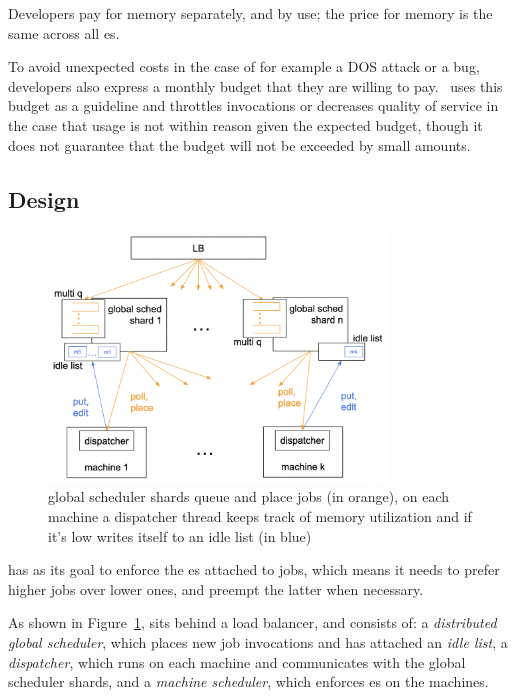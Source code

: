 Developers pay for memory separately, and by use; the price for memory is the
same across all \class{}es.

To avoid unexpected costs in the case of for example a DOS attack or a bug,
developers also express a monthly budget that they are willing to pay.\ \sys{}
uses this budget as a guideline and throttles invocations or decreases quality
of service in the case that usage is not within reason given the expected
budget, though it does not guarantee that the budget will not be exceeded by
small amounts.



\subsection{\Sys{} Design}

\begin{figure}[t]
    \centering
      \includegraphics[width=9cm]{img/overview.png}
      \caption{ global scheduler shards queue and place jobs (in orange), 
      on each machine a dispatcher thread keeps track of memory utilization 
      and if it's low writes itself to an idle list (in blue) }
    \label{fig:overview}
\end{figure}



\Sys{} has as its goal to enforce the \class{}es attached to jobs, which means
it needs to prefer higher \class{} jobs over lower ones, and preempt the latter
when necessary.
  

As shown in Figure~\ref{fig:overview}, \sys{} sits behind a load balancer, and
consists of: a \textit{distributed global scheduler}, which places new job
invocations and has attached an \textit{idle list}, a \textit{dispatcher},
which runs on each machine and communicates with the global scheduler shards,
and a \textit{machine scheduler}, which enforces \class{}es on the machines.


